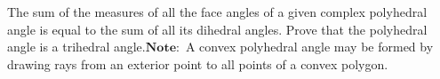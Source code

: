 The sum of the measures of all the face angles of a given complex polyhedral angle is equal to the sum of all its dihedral angles. Prove that the polyhedral angle is a trihedral angle.$\mathbf{Note:}$ A convex polyhedral angle may be formed by drawing rays from an exterior point to all points of a convex polygon.
